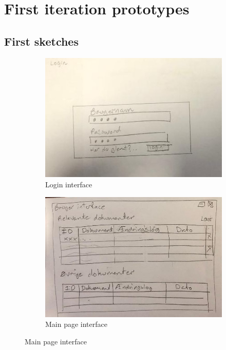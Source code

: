 \chapter{First iteration prototypes}\label{chap:1-Prototypes}

\section{First sketches}\label{sec:First-sketches}
\begin{figure}[H]
		\centering
		\begin{subfigure}[b]{0.48\textwidth}
			\includegraphics[width=\textwidth]{billeder/login-view.jpg}
			\caption{Login interface}
			\label{fig:1-Login}
		\end{subfigure}
		\quad
		\begin{subfigure}[b]{0.48\textwidth}
			\includegraphics[width=\textwidth]{billeder/Main-view.jpg}
			\caption{Main page interface}
			\label{fig:1-Main}
		\end{subfigure}
\end{figure}
